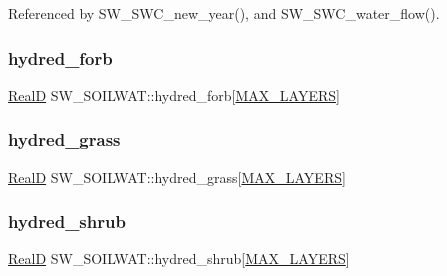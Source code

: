 Referenced by S\+W\+\_\+\+S\+W\+C\+\_\+new\+\_\+year(), and S\+W\+\_\+\+S\+W\+C\+\_\+water\+\_\+flow().

\mbox{\label{struct_s_w___s_o_i_l_w_a_t_af4967dc3798621e76f8dfc46534cdd19}} 
\subsubsection{\texorpdfstring{hydred\+\_\+forb}{hydred\_forb}}
{\footnotesize\ttfamily \hyperlink{generic_8h_af1c105fd5732f70b91ddaeda0cc340e3}{RealD} S\+W\+\_\+\+S\+O\+I\+L\+W\+A\+T\+::hydred\+\_\+forb\mbox{[}\hyperlink{_s_w___defines_8h_ade9d4b2ac5f29fe89ffea40e7c58c9d6}{M\+A\+X\+\_\+\+L\+A\+Y\+E\+RS}\mbox{]}}

\mbox{\label{struct_s_w___s_o_i_l_w_a_t_ad7cc379ceaeccbcb0868e32670c36a87}} 
\subsubsection{\texorpdfstring{hydred\+\_\+grass}{hydred\_grass}}
{\footnotesize\ttfamily \hyperlink{generic_8h_af1c105fd5732f70b91ddaeda0cc340e3}{RealD} S\+W\+\_\+\+S\+O\+I\+L\+W\+A\+T\+::hydred\+\_\+grass\mbox{[}\hyperlink{_s_w___defines_8h_ade9d4b2ac5f29fe89ffea40e7c58c9d6}{M\+A\+X\+\_\+\+L\+A\+Y\+E\+RS}\mbox{]}}

\mbox{\label{struct_s_w___s_o_i_l_w_a_t_a57fe08c905dbed174e9ca34aecc21fed}} 
\subsubsection{\texorpdfstring{hydred\+\_\+shrub}{hydred\_shrub}}
{\footnotesize\ttfamily \hyperlink{generic_8h_af1c105fd5732f70b91ddaeda0cc340e3}{RealD} S\+W\+\_\+\+S\+O\+I\+L\+W\+A\+T\+::hydred\+\_\+shrub\mbox{[}\hyperlink{_s_w___defines_8h_ade9d4b2ac5f29fe89ffea40e7c58c9d6}{M\+A\+X\+\_\+\+L\+A\+Y\+E\+RS}\mbox{]}}

